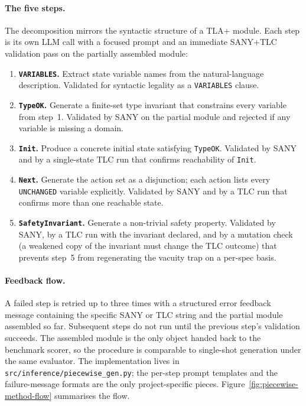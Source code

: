 \documentclass[11pt]{article}
\begin{document}
\paragraph{The five steps.} The decomposition mirrors the syntactic
structure of a TLA+ module. Each step is its own LLM call with a
focused prompt and an immediate SANY+TLC validation pass on the
partially assembled module:
\begin{enumerate}[leftmargin=1.4em, itemsep=2pt]
\item \textbf{\texttt{VARIABLES}.} Extract state variable names from
  the natural-language description. Validated for syntactic legality
  as a \texttt{VARIABLES} clause.
\item \textbf{\texttt{TypeOK}.} Generate a finite-set type invariant
  that constrains every variable from step~1. Validated by SANY on the
  partial module and rejected if any variable is missing a domain.
\item \textbf{\texttt{Init}.} Produce a concrete initial state
  satisfying \texttt{TypeOK}. Validated by SANY and by a single-state
  TLC run that confirms reachability of \texttt{Init}.
\item \textbf{\texttt{Next}.} Generate the action set as a disjunction;
  each action lists every \texttt{UNCHANGED} variable explicitly.
  Validated by SANY and by a TLC run that confirms more than one
  reachable state.
\item \textbf{\texttt{SafetyInvariant}.} Generate a non-trivial safety
  property. Validated by SANY, by a TLC run with the invariant
  declared, and by a mutation check (a weakened copy of the invariant
  must change the TLC outcome) that prevents step~5 from regenerating
  the vacuity trap on a per-spec basis.
\end{enumerate}

\paragraph{Feedback flow.} A failed step is retried up to three times
with a structured error feedback message containing the specific SANY
or TLC string and the partial module assembled so far. Subsequent steps
do not run until the previous step's validation succeeds. The
assembled module is the only object handed back to the benchmark
scorer, so the procedure is comparable to single-shot generation under
the same evaluator. The implementation lives in
\texttt{src/inference/piecewise\_gen.py}; the per-step prompt
templates and the failure-message formats are the only project-specific
pieces. Figure~\ref{fig:piecewise-method-flow} summarises the flow.
\end{document}
